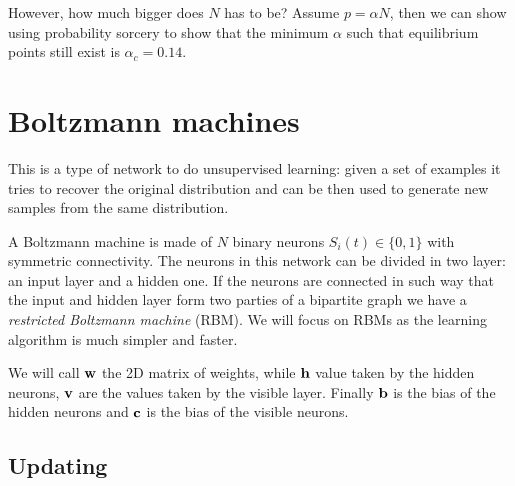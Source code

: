 \documentclass[12pt]{extarticle}
\renewcommand{\vec}[1]{\bvec{#1}}
\begin{document}
However, how much bigger does $N$ has to be?
Assume $p = \alpha N$, then we can show using probability sorcery to show that the minimum $\alpha$
such that equilibrium points still exist is $\alpha_c = 0.14$.

\section{Boltzmann machines}
This is a type of network to do unsupervised learning: given a set of examples it tries to recover
the original distribution and can be then used to generate new samples from the same distribution.

A Boltzmann machine is made of $N$ binary neurons $S_i(t) \in \{0, 1\}$ with symmetric connectivity.
The neurons in this network can be divided in two layer: an input layer and a hidden one.
If the neurons are connected in such way that the input and hidden layer form two parties of a
bipartite graph we have a \emph{restricted Boltzmann machine} (RBM).
We will focus on RBMs as the learning algorithm is much simpler and faster.

We will call $\vec w$ the 2D matrix of weights, while $\vec h$ value taken by the hidden neurons,
$\vec v$ are the values taken by the visible layer. Finally $\vec b$ is the bias of the hidden
neurons and $\vec c$ is the bias of the visible neurons.

\subsection{Updating}
\end{document}
